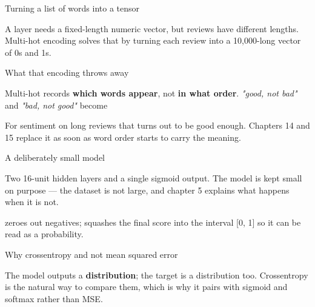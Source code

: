 \documentclass[aspectratio=169,11pt,t]{beamer}
\begin{document}
\begin{frame}[shrink=25]{Turning a list of words into a tensor}
{\fontsize{9.4}{12.6}\selectfont\color{fg2}A  layer needs a fixed-length numeric vector, but reviews have different lengths. Multi-hot encoding solves that by turning each review into a 10,000-long vector of 0s and 1s.\par}\vskip 4pt
\end{frame}

\begin{frame}[shrink=25]{What that encoding throws away}
\begin{iband}[amber]
Multi-hot records \textbf{which words appear}, not \textbf{in what order}. \textit{"good, not bad"} and \textit{"bad, not good"} become 
\end{iband}
{\fontsize{9.4}{12.6}\selectfont\color{fg2}For sentiment on long reviews that turns out to be good enough. Chapters 14 and 15 replace it as soon as word order starts to carry the meaning.\par}\vskip 4pt
\end{frame}

\begin{frame}[shrink=25]{A deliberately small model}
{\fontsize{9.4}{12.6}\selectfont\color{fg2}Two 16-unit hidden layers and a single sigmoid output. The model is kept small on purpose --- the dataset is not large, and chapter 5 explains what happens when it is not.\par}\vskip 4pt
{\fontsize{9.4}{12.6}\selectfont\color{fg2} zeroes out negatives;  squashes the final score into the interval [0, 1] so it can be read as a probability.\par}\vskip 4pt
\end{frame}

\begin{frame}[shrink=25]{Why crossentropy and not mean squared error}
\begin{iquote}
\end{iquote}
{\fontsize{9.4}{12.6}\selectfont\color{fg2}The model outputs a \textbf{distribution}; the target is a distribution too. Crossentropy is the natural way to compare them, which is why it pairs with sigmoid and softmax rather than MSE.\par}\vskip 4pt
\end{frame}
\end{document}
